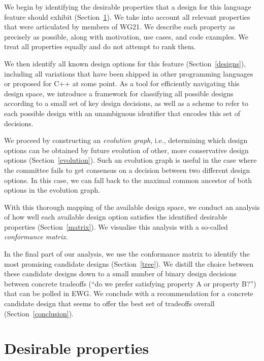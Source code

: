 We begin by identifying the desirable properties that a design for this language feature should exhibit (Section~\ref{properties}). We take into account all relevant properties that were articulated by members of WG21. We describe each property as precisely as possible, along with motivation, use cases, and code examples. We treat all properties equally and do not attempt to rank them.

We then identify all known design options for this feature (Section~\ref{designs}), including all variations that have been shipped in other programming languages or proposed for C++ at some point. As a tool for efficiently navigating this design space, we introduce a framework for classifying all possible designs according to a small set of key design decisions, as well as a scheme to refer to each possible design with an unambiguous identifier that encodes this set of decisions.

We proceed by constructing an \emph{evolution graph}, i.e., determining which design options can be obtained by future evolution of other, more conservative design options (Section~\ref{evolution}). Such an evolution graph is useful in the case where the committee fails to get consensus on a decision between two different design options. In this case, we can fall back to the maximal common ancestor of both options in the evolution graph.

With this thorough mapping of the available design space, we conduct an analysis of how well each available design option satisfies the identified desirable properties (Section~\ref{matrix}). We visualise this analysis with a so-called \emph{conformance matrix}. 

In the final part of our analysis, we use the conformance matrix to identify the most promising candidate designs (Section~\ref{tree}). We distill the choice between these candidate designs down to a small number of binary design decisions between concrete tradeoffs (``do we prefer satisfying property A or property B?'') that can be polled in EWG. We conclude with a recommendation for a concrete candidate design that seems to offer the best set of tradeoffs overall (Section~\ref{conclusion}).


\section{Desirable properties}
\label{properties}


